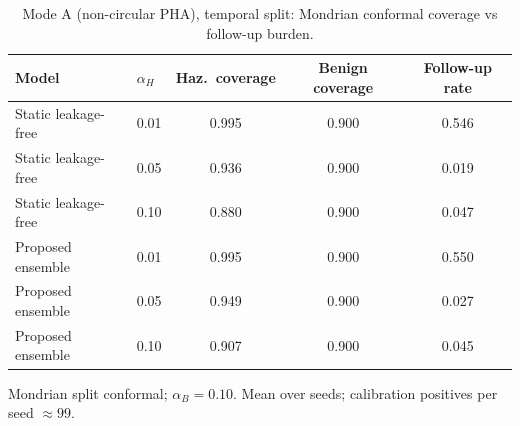 \begin{table}[t]
\centering
\small
\caption{Mode A (non-circular PHA), temporal split: Mondrian conformal coverage vs follow-up burden.}
\label{tab:conf_pha_temporal}
\begin{tabular}{llccc}
\toprule
Model & $\alpha_H$ & Haz.\ coverage & Benign coverage & Follow-up rate \\
\midrule
Static leakage-free & 0.01 & 0.995 & 0.900 & 0.546 \\
Static leakage-free & 0.05 & 0.936 & 0.900 & 0.019 \\
Static leakage-free & 0.10 & 0.880 & 0.900 & 0.047 \\
\midrule
Proposed ensemble & 0.01 & 0.995 & 0.900 & 0.550 \\
Proposed ensemble & 0.05 & 0.949 & 0.900 & 0.027 \\
Proposed ensemble & 0.10 & 0.907 & 0.900 & 0.045 \\
\bottomrule
\end{tabular}
\par\vspace{2pt}\footnotesize Mondrian split conformal; $\alpha_B=0.10$. Mean over seeds; calibration positives per seed $\approx 99$.
\end{table}
